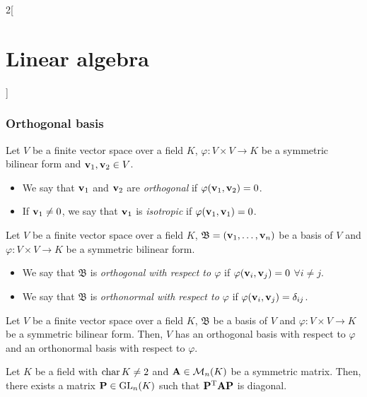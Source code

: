 \documentclass[../../../main.tex]{subfiles}
\begin{document}
\begin{multicols}{2}[\section{Linear algebra}]
    \subsubsection*{Orthogonal basis}
    \begin{definition}\label{ALG-isotrop}
        Let $V$ be a finite vector space over a field $K$, $\varphi:V\times V\rightarrow K$ be a symmetric bilinear form and $\boldsymbol{\mathrm{v}}_1,\boldsymbol{\mathrm{v}}_2\in V$.
        \begin{itemize}
            \item We say that $\boldsymbol{\mathrm{v}}_1$ and $\boldsymbol{\mathrm{v}}_2$ are \textit{orthogonal} if $\varphi(\boldsymbol{\mathrm{v}}_1,\boldsymbol{\mathrm{v}}_2)=0$.
            \item If $\boldsymbol{\mathrm{v}}_1\ne 0$, we say that $\boldsymbol{\mathrm{v}}_1$ is \textit{isotropic} if $\varphi(\boldsymbol{\mathrm{v}}_1,\boldsymbol{\mathrm{v}}_1)=0$.
        \end{itemize}
    \end{definition}
    \begin{definition}
        Let $V$ be a finite vector space over a field $K$, $\mathfrak{B}=(\boldsymbol{\mathrm{v}}_1,\ldots,\boldsymbol{\mathrm{v}}_n)$ be a basis of $V$ and $\varphi:V\times V\rightarrow K$ be a symmetric bilinear form.
        \begin{itemize}
            \item We say that $\mathfrak{B}$ is \textit{orthogonal with respect to $\varphi$} if $\varphi(\boldsymbol{\mathrm{v}}_i,\boldsymbol{\mathrm{v}}_j)=0$ $\forall i\ne j$.
            \item We say that $\mathfrak{B}$ is \textit{orthonormal with respect to $\varphi$} if $\varphi(\boldsymbol{\mathrm{v}}_i,\boldsymbol{\mathrm{v}}_j)=\delta_{ij}$.
        \end{itemize}
    \end{definition}
    \begin{theorem}
        Let $V$ be a finite vector space over a field $K$, $\mathfrak{B}$ be a basis of $V$ and $\varphi:V\times V\rightarrow K$ be a symmetric bilinear form. Then, $V$ has an orthogonal basis with respect to $\varphi$ and an orthonormal basis with respect to $\varphi$.
    \end{theorem}
    \begin{corollary}
        Let $K$ be a field with $\operatorname{char} K\ne 2$ and $\boldsymbol{\mathrm{A}}\in\mathcal{M}_n(K)$ be a symmetric matrix. Then, there exists a matrix $\boldsymbol{\mathrm{P}}\in\mathrm{GL}_n(K)$ such that $\vb{P}^{\mathrm{T}}\boldsymbol{\mathrm{A}}\boldsymbol{\mathrm{P}}$ is diagonal.
    \end{corollary}

\end{multicols}
\end{document}
